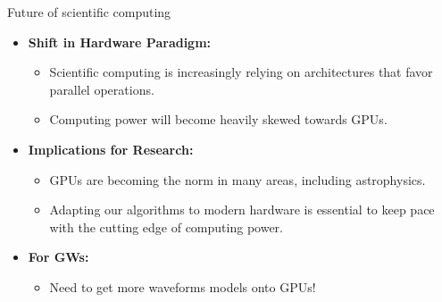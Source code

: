 \documentclass[aspectratio=169, 11pt]{beamer}
\begin{document}
\begin{frame}{Future of scientific computing}
  \begin{itemize}
    \item \textbf{Shift in Hardware Paradigm:}  
    \begin{itemize}
        \item  Scientific computing is increasingly relying on architectures that favor parallel operations. 
        \item Computing power will become heavily skewed towards GPUs.
    \end{itemize}
      
    \item \textbf{Implications for Research:}
      \begin{itemize}
      \item GPUs are becoming the norm in many areas, including astrophysics.
        \item Adapting our algorithms to modern hardware is essential to keep pace with the cutting edge of computing power.
      \end{itemize}
      \item \textbf{For GWs:}
      \begin{itemize}
          \item Need to get more waveforms models onto GPUs!
      \end{itemize}
  \end{itemize}
\end{frame}

\end{document}
